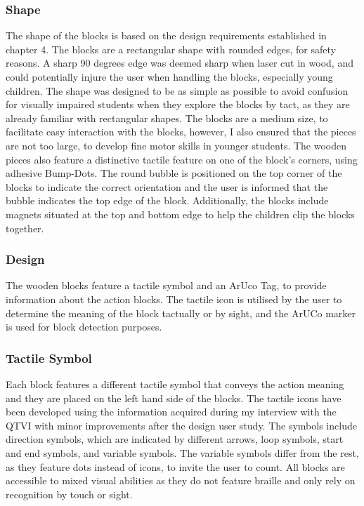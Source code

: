 \documentclass[oneside,%
                    author={Malak Hajji},
                    degree={BSc},
                    title={Designing An Accessible Computational Toolkit For Students},
                  subtitle={With Mixed Visual Abilities}]{dissertation}
\begin{document}
\subsubsection{Shape}
The shape of the blocks is based on the design requirements established in chapter 4. The blocks are a rectangular shape with rounded edges, for safety reasons. A sharp 90 degrees edge was deemed sharp when laser cut in wood, and could potentially injure the user when handling the blocks, especially young children. The shape was designed to be as simple as possible to avoid confusion for visually impaired students when they explore the blocks by tact, as they are already familiar with rectangular shapes. The blocks are a medium size, to facilitate easy interaction with the blocks, however, I also ensured that the pieces are not too large, to develop fine motor skills in younger students. The wooden pieces also feature a distinctive tactile feature on one of the block’s corners, using adhesive Bump-Dots. The round bubble is positioned on the top corner of the blocks to indicate the correct orientation and the user is informed that the bubble indicates the top edge of the block. Additionally, the blocks include magnets situated at the top and bottom edge to help the children clip the blocks together.

\subsubsection{Design}
The wooden blocks feature a tactile symbol and an ArUco Tag, to provide information about the action blocks. The tactile icon is utilised by the user to determine the meaning of the block tactually or by sight, and the ArUCo marker is used for block detection purposes. 
\subsubsection{Tactile Symbol}
Each block features a different tactile symbol that conveys the action meaning and they are placed on the left hand side of the blocks. The tactile icons have been developed using the information acquired during my interview with the QTVI with minor improvements after the design user study. The symbols include direction symbols, which are indicated by different arrows, loop symbols, start and end symbols, and variable symbols. The variable symbols differ from the rest, as they feature dots instead of icons, to invite the user to count.  All blocks are accessible to mixed visual abilities as they do not feature braille and only rely on recognition by touch or sight.
\end{document}
